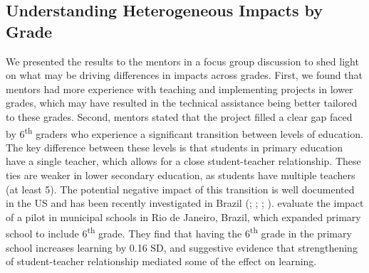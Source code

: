 \documentclass[11pt,a4paper]{article}
\begin{document}
	\subsection{Understanding Heterogeneous Impacts by Grade}
	
	We presented the results to the mentors in a focus group discussion to shed light on what may be driving differences in impacts across grades. First, we found that mentors had more experience with teaching and implementing projects in lower grades, which may have resulted in the technical assistance being better tailored to these grades. Second, mentors stated that the project filled a clear gap faced by 6\textsuperscript{th} graders who experience a significant transition between levels of education. The key difference between these levels is that students in primary education have a single teacher, which allows for a close student-teacher relationship. These ties are weaker in lower secondary education, as students have multiple teachers (at least 5). The potential negative impact of this transition is well documented in the US and has been recently investigated in Brazil (\citealp{bedard2005middle}; \citealp{cook2006should}; \citealp{hanewald2013transition}; \citealp{dos2017mais}). \cite{dos2017mais} evaluate the impact of a pilot in municipal schools in Rio de Janeiro, Brazil, which expanded primary school to include  6\textsuperscript{th} grade. They find that having the 6\textsuperscript{th} grade in the primary school increases learning by 0.16 SD, and suggestive evidence that strengthening of student-teacher relationship mediated some of the effect on learning.  
	
\end{document}

